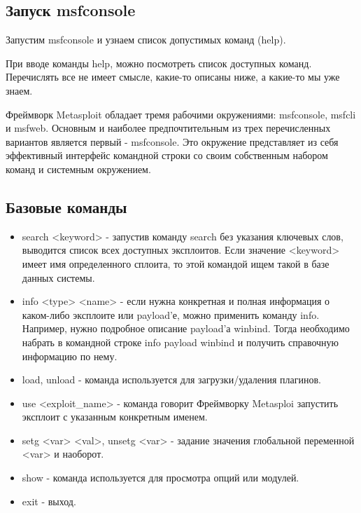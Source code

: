 \documentclass[11pt, a4paper]{article}		%
\begin{document}

\subsection{Запуск msfconsole}

Запустим msfconsole и узнаем список допустимых команд (help).

При вводе команды help, можно посмотреть список доступных команд. Перечислять все не имеет смысле, какие-то описаны ниже, а какие-то мы уже знаем.

Фреймворк Metasploit обладает тремя рабочими окружениями: msfconsole, msfcli и msfweb. Основным и наиболее предпочтительным из трех перечисленных вариантов является первый - msfconsole. Это окружение представляет из себя эффективный интерфейс командной строки со своим собственным набором команд и системным окружением.


\subsection{Базовые команды}

\begin{itemize}

\item search <keyword> - запустив команду search без указания ключевых слов, выводится список всех доступных эксплоитов. Если значение <keyword> имеет имя определенного сплоита, то этой командой ищем такой в базе данных системы.

\item info <type> <name> - если нужна конкретная и полная информация о каком-либо эксплоите или payload’е, можно применить команду info. Например, нужно подробное описание payload’а winbind. Тогда необходимо набрать в командной строке info payload winbind и получить справочную информацию по нему.

\item load, unload - команда используется для загрузки/удаления плагинов.

\item use <exploit\_name> - команда говорит Фреймворку Metasploi запустить эксплоит с указанным конкретным именем.

\item setg <var> <val>, unsetg <var> - задание значения глобальной переменной <var> и наоборот.

\item show - команда используется для просмотра опций или модулей.

\item exit - выход.

\end{itemize}
\end{document}
